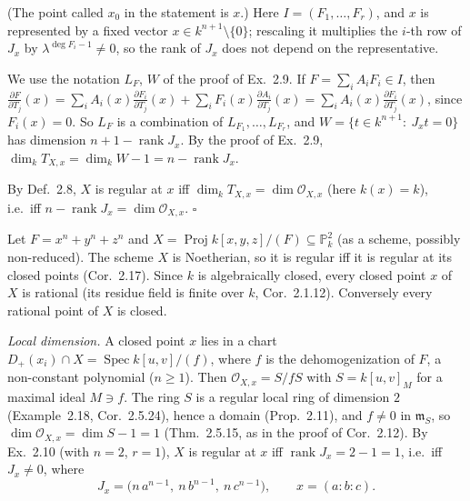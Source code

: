 \documentclass[11pt]{article}
\begin{document}
\pf
(The point called $x_0$ in the statement is $x$.) Here $I=(F_1,\dots,F_r)$, and $x$ is represented by a fixed vector $x\in k^{n+1}\setminus\{0\}$; rescaling it multiplies the $i$-th row of $J_x$ by $\lambda^{\deg F_i-1}\neq 0$, so the rank of $J_x$ does not depend on the representative.

We use the notation $L_F$, $W$ of the proof of Ex.~2.9. If $F=\sum_iA_iF_i\in I$, then $\frac{\partial F}{\partial T_j}(x)=\sum_iA_i(x)\frac{\partial F_i}{\partial T_j}(x)+\sum_iF_i(x)\frac{\partial A_i}{\partial T_j}(x)=\sum_iA_i(x)\frac{\partial F_i}{\partial T_j}(x)$, since $F_i(x)=0$. So $L_F$ is a combination of $L_{F_1},\dots,L_{F_r}$, and $W=\{t\in k^{n+1}:\ J_xt=0\}$ has dimension $n+1-\operatorname{rank}J_x$. By the proof of Ex.~2.9, $\dim_kT_{X,x}=\dim_kW-1=n-\operatorname{rank}J_x$.

By Def.~2.8, $X$ is regular at $x$ iff $\dim_kT_{X,x}=\dim\mathcal O_{X,x}$ (here $k(x)=k$), i.e.\ iff $n-\operatorname{rank}J_x=\dim\mathcal O_{X,x}$. \hfill$\square$

\pf
Let $F=x^n+y^n+z^n$ and $X=\operatorname{Proj}k[x,y,z]/(F)\subseteq\mathbb P^2_k$ (as a scheme, possibly non-reduced). The scheme $X$ is Noetherian, so it is regular iff it is regular at its closed points (Cor.~2.17). Since $k$ is algebraically closed, every closed point $x$ of $X$ is rational (its residue field is finite over $k$, Cor.~2.1.12). Conversely every rational point of $X$ is closed.

\emph{Local dimension.} A closed point $x$ lies in a chart $D_+(x_i)\cap X=\operatorname{Spec}k[u,v]/(f)$, where $f$ is the dehomogenization of $F$, a non-constant polynomial ($n\ge1$). Then $\mathcal O_{X,x}=S/fS$ with $S=k[u,v]_M$ for a maximal ideal $M\ni f$. The ring $S$ is a regular local ring of dimension $2$ (Example~2.18, Cor.~2.5.24), hence a domain (Prop.~2.11), and $f\ne0$ in $\mathfrak m_S$, so $\dim\mathcal O_{X,x}=\dim S-1=1$ (Thm.~2.5.15, as in the proof of Cor.~2.12). By Ex.~2.10 (with $n=2$, $r=1$), $X$ is regular at $x$ iff $\operatorname{rank}J_x=2-1=1$, i.e.\ iff $J_x\ne0$, where
\[ J_x=\bigl(n\,a^{n-1},\ n\,b^{n-1},\ n\,c^{n-1}\bigr),\qquad x=(a:b:c). \]
\end{document}
